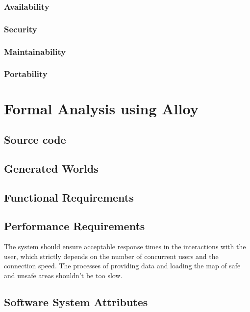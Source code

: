 \subsubsection{Availability}
\subsubsection{Security}
\subsubsection{Maintainability}
\subsubsection{Portability}

\clearpage

\section{Formal Analysis using Alloy}

\subsection{Source code}
		
		
\subsection{Generated Worlds}

\clearpage





\subsection{Functional Requirements}


  	
\subsection{Performance Requirements}
	The system should ensure acceptable response times in the interactions with the user, which strictly depends on the number of concurrent users and the connection speed.
\newline
The processes of providing data and loading the map of safe and unsafe areas shouldn't be too slow.
\subsection{Software System Attributes}
